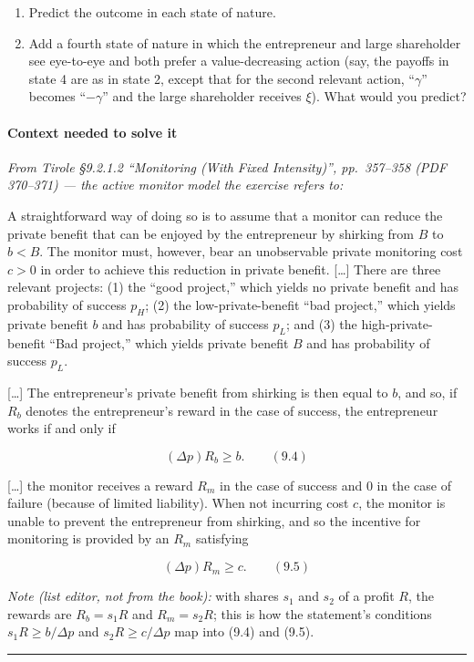 \documentclass[11pt,a4paper]{article}
\newcommand{\stmtend}{\par\endgroup\nopagebreak\noindent\rule{\linewidth}{0.4pt}\par\medskip}
\begin{document}
\begin{enumerate}
\def\labelenumi{(\roman{enumi})}
\item
  Predict the outcome in each state of nature.
\item
  Add a fourth state of nature in which the entrepreneur and large shareholder see eye-to-eye and
  both prefer a value-decreasing action (say, the payoffs in state 4 are as in state 2, except that
  for the second relevant action, ``\(\gamma\)'' becomes ``\(-\gamma\)'' and the large shareholder
  receives \(\xi\)). What would you predict?
\end{enumerate}

\paragraph{Context needed to solve it}

\emph{From Tirole §9.2.1.2 ``Monitoring (With Fixed Intensity)'', pp.~357--358 (PDF 370--371) ---
the active monitor model the exercise refers to:}

A straightforward way of doing so is to assume that a monitor can reduce the private benefit that
can be enjoyed by the entrepreneur by shirking from \(B\) to \(b < B\). The monitor must, however,
bear an unobservable private monitoring cost \(c > 0\) in order to achieve this reduction in private
benefit. {[}\ldots{]} There are three relevant projects: (1) the ``good project,'' which yields no
private benefit and has probability of success \(p_H\); (2) the low-private-benefit ``bad project,''
which yields private benefit \(b\) and has probability of success \(p_L\); and (3) the
high-private-benefit ``Bad project,'' which yields private benefit \(B\) and has probability of
success \(p_L\).

{[}\ldots{]} The entrepreneur's private benefit from shirking is then equal to \(b\), and so, if
\(R_b\) denotes the entrepreneur's reward in the case of success, the entrepreneur works if and only
if

\[(\Delta p)R_b \geqslant b. \qquad (9.4)\]

{[}\ldots{]} the monitor receives a reward \(R_m\) in the case of success and 0 in the case of
failure (because of limited liability). When not incurring cost \(c\), the monitor is unable to
prevent the entrepreneur from shirking, and so the incentive for monitoring is provided by an
\(R_m\) satisfying

\[(\Delta p)R_m \geqslant c. \qquad (9.5)\]

\emph{Note (list editor, not from the book):} with shares \(s_1\) and \(s_2\) of a profit \(R\), the
rewards are \(R_b = s_1 R\) and \(R_m = s_2 R\); this is how the statement's conditions
\(s_1 R \geqslant b/\Delta p\) and \(s_2 R \geqslant c/\Delta p\) map into (9.4) and (9.5).
\stmtend
\end{document}

